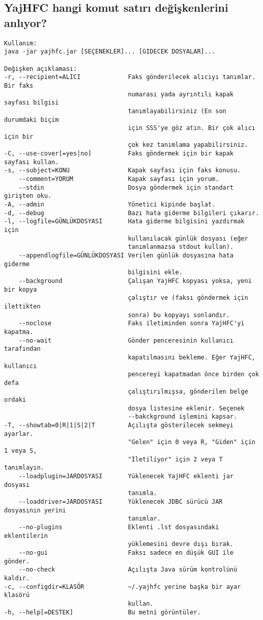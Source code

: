 \documentclass[a4paper,10pt]{scrartcl}
\begin{document}
\subsection{YajHFC hangi komut satırı değişkenlerini anlıyor?}

\begin{verbatim}
Kullanım:
java -jar yajhfc.jar [SEÇENEKLER]... [GIDECEK DOSYALAR]...

Değişken açıklaması:
-r, --recipient=ALICI             Faks gönderilecek alıcıyı tanımlar. Bir faks
                                  numarası yada ayrıntılı kapak sayfası bilgisi
                                  tanımlayabilirsiniz (En son durumdaki biçim
                                  için SSS'ye göz atın. Bir çok alıcı için bir
                                  çok kez tanımlama yapabilirsiniz.
-C, --use-cover[=yes|no]          Faks göndermek için bir kapak sayfası kullan.
-s, --subject=KONU                Kapak sayfası için faks konusu.
    --comment=YORUM               Kapak sayfası için yorum.
    --stdin                       Dosya göndermek için standart girişten oku.
-A, --admin                       Yönetici kipinde başlat.
-d, --debug                       Bazı hata giderme bilgileri çıkarır.
-l, --logfile=GÜNLÜKDOSYASI       Hata giderme bilgisini yazdırmak için
                                  kullanılacak günlük dosyası (eğer
                                  tanımlanmazsa stdout kullan).
    --appendlogfile=GÜNLÜKDOSYASI Verilen günlük dosyasına hata giderme
                                  bilgisini ekle.
    --background                  Çalışan YajHFC kopyası yoksa, yeni bir kopya
                                  çalıştır ve (faksı göndermek için ilettikten
                                  sonra) bu kopyayı sonlandır.
    --noclose                     Faks iletiminden sonra YajHFC'yi kapatma.
    --no-wait                     Gönder penceresinin kullanıcı tarafından
                                  kapatılmasını bekleme. Eğer YajHFC, kullanıcı
                                  pencereyi kapatmadan önce birden çok defa
                                  çalıştırılmışsa, gönderilen belge ordaki
                                  dosya listesine eklenir. Seçenek
                                  --bakckground işlemini kapsar.
-T, --showtab=0|R|1|S|2|T         Açılışta gösterilecek sekmeyi ayarlar.
                                  "Gelen" için 0 veya R, "Giden" için 1 veya S,
                                  "İletiliyor" için 2 veya T tanımlayın.
    --loadplugin=JARDOSYASI       Yüklenecek YajHFC eklenti jar dosyası
                                  tanımla.
    --loaddriver=JARDOSYASI       Yüklenecek JDBC sürücü JAR dosyasının yerini
                                  tanımlar.
    --no-plugins                  Eklenti .lst dosyasındaki eklentilerin
                                  yüklemesini devre dışı bırak.
    --no-gui                      Faksı sadece en düşük GUI ile gönder.
    --no-check                    Açılışta Java sürüm kontrolünü kaldır.
-c, --configdir=KLASÖR            ~/.yajhfc yerine başka bir ayar klasörü
                                  kullan.
-h, --help[=DESTEK]               Bu metni görüntüler.
\end{verbatim}
\end{document}
